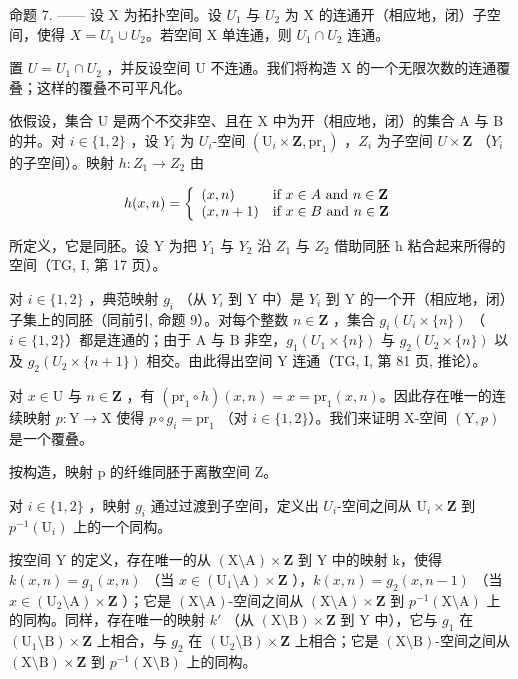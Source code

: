 命题 7. —— 设 X 为拓扑空间。设 \(U_{1}\) 与 \(U_{2}\) 为 X 的连通开（相应地，闭）子空间，使得 \(X = U_{1} \cup U_{2}\)。若空间 X 单连通，则 \(U_{1} \cap U_{2}\) 连通。

置 \(U = U_{1} \cap U_{2}\) ，并反设空间 U 不连通。我们将构造 X 的一个无限次数的连通覆叠；这样的覆叠不可平凡化。

依假设，集合 U 是两个不交非空、且在 X 中为开（相应地，闭）的集合 A 与 B 的并。对 \(i \in \{1, 2\}\) ，设 \(Y_i\) 为 \(U_i\)-空间 \((\mathrm{U}_i \times \mathbf{Z}, \mathrm{pr}_1)\) ，\(Z_i\) 为子空间 \(U \times \mathbf{Z}\) （\(Y_i\) 的子空间）。映射 \(h: Z_1 \to Z_2\) 由

\[
h (x, n) = \left\{ \begin{array}{l l} (x, n) & \text {if } x\in A \text { and } n\in \mathbf {Z} \\ (x, n + 1) & \text {if } x\in B \text { and } n\in \mathbf {Z} \end{array} \right.
\]

所定义，它是同胚。设 Y 为把 \(Y_{1}\) 与 \(Y_{2}\) 沿 \(Z_{1}\) 与 \(Z_{2}\) 借助同胚 h 粘合起来所得的空间（TG, I, 第 17 页）。

对 \(i \in \{1,2\}\) ，典范映射 \(g_i\) （从 \(Y_i\) 到 Y 中）是 \(Y_i\) 到 Y 的一个开（相应地，闭）子集上的同胚（同前引, 命题 9）。对每个整数 \(n \in \mathbf{Z}\) ，集合 \(g_i(U_i \times \{n\})\) （\(i \in \{1,2\}\)）都是连通的；由于 A 与 B 非空，\(g_1(U_1 \times \{n\})\) 与 \(g_2(U_2 \times \{n\})\) 以及 \(g_2(U_2 \times \{n+1\})\) 相交。由此得出空间 Y 连通（TG, I, 第 81 页, 推论）。

对 \(x \in \mathrm{U}\) 与 \(n \in \mathbf{Z}\) ，有 \((\mathrm{pr}_1 \circ h)(x, n) = x = \mathrm{pr}_1(x, n)\)。因此存在唯一的连续映射 \(p \colon \mathrm{Y} \to \mathrm{X}\) 使得 \(p \circ g_i = \mathrm{pr}_1\) （对 \(i \in \{1, 2\}\)）。我们来证明 X-空间 \((\mathrm{Y}, p)\) 是一个覆叠。

按构造，映射 p 的纤维同胚于离散空间 Z。

对 \(i \in \{1,2\}\) ，映射 \(g_i\) 通过过渡到子空间，定义出 \(U_i\)-空间之间从 \(\mathrm{U}_i \times \mathbf{Z}\) 到 \(p^{-1}(\mathrm{U}_i)\) 上的一个同构。

按空间 Y 的定义，存在唯一的从 \((\mathrm{X}\setminus\mathrm{A})\times\mathbf{Z}\) 到 Y 中的映射 k，使得 \(k(x,n)=g_{1}(x,n)\) （当 \(x\in(\mathrm{U}_{1}\setminus\mathrm{A})\times\mathbf{Z}\) ），\(k(x,n)=g_{2}(x,n-1)\) （当 \(x\in(\mathrm{U}_{2}\setminus\mathrm{A})\times\mathbf{Z}\) ）；它是 \((\mathrm{X}\setminus\mathrm{A})\)-空间之间从 \((\mathrm{X}\setminus\mathrm{A})\times\mathbf{Z}\) 到 \(p^{-1}(\mathrm{X}\setminus\mathrm{A})\) 上的同构。同样，存在唯一的映射 \(k'\) （从 \((\mathrm{X}\setminus\mathrm{B})\times\mathbf{Z}\) 到 Y 中），它与 \(g_{1}\) 在 \((\mathrm{U}_{1}\setminus\mathrm{B})\times\mathbf{Z}\) 上相合，与 \(g_{2}\) 在 \((\mathrm{U}_{2}\setminus\mathrm{B})\times\mathbf{Z}\) 上相合；它是 \((\mathrm{X}\setminus\mathrm{B})\)-空间之间从 \((\mathrm{X}\setminus\mathrm{B})\times\mathbf{Z}\) 到 \(p^{-1}(\mathrm{X}\setminus\mathrm{B})\) 上的同构。

